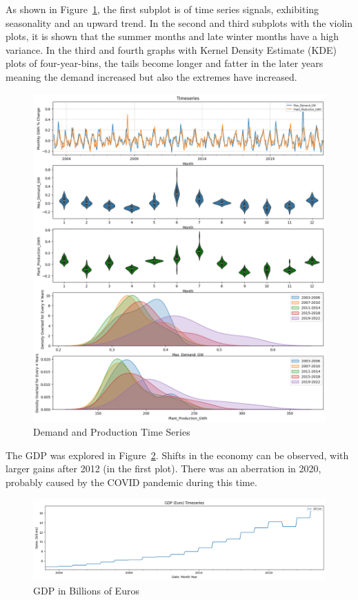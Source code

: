 \documentclass{ieeeaccess}
\begin{document}
As shown in Figure~\ref{fig:elec_timeseries}, the first subplot is of time series signals, exhibiting seasonality and an upward trend.
In the second and third subplots with the violin plots, it is shown that the summer months and late winter months have a high variance.
In the third and fourth graphs with Kernel Density Estimate (KDE) plots of four-year-bins, the tails become longer and fatter in the later years meaning the demand increased but also the extremes have increased.
\begin{figure}[htb]
    \centering
    \includegraphics[width=\columnwidth]{data_analysis/production_timeseries.png}
    \caption{Demand and Production Time Series}
    \label{fig:elec_timeseries}
\end{figure}

The GDP was explored in Figure~\ref{fig:gdp_timeseries}. Shifts in the economy can be observed, with larger gains after 2012 (in the first plot). There was an aberration in 2020, probably caused by the COVID pandemic during this time.
\begin{figure}[htb]
    \centering
    \includegraphics[width=\columnwidth]{data_analysis/gdp_timeseries.png}
    \caption{GDP in Billions of Euros}
    \label{fig:gdp_timeseries}
\end{figure}
\end{document}
